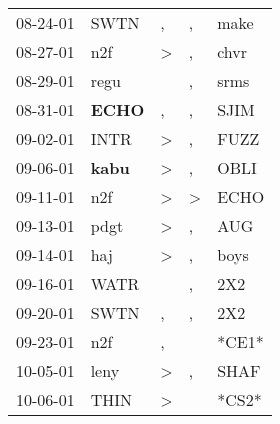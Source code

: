 \begin{supertabular}{p{0.07\textwidth}p{0.06\textwidth}p{0.02\textwidth}p{0.02\textwidth}p{0.06\textwidth}}
          08-24-01\textsuperscript{} &           SWTN\textsuperscript{} &                , &                , &           make\textsuperscript{} \\
          08-27-01\textsuperscript{} &            n2f\textsuperscript{} &     \textgreater &                , &           chvr\textsuperscript{} \\
          08-29-01\textsuperscript{} &           regu\textsuperscript{} &                  &                , &           srms\textsuperscript{} \\
          08-31-01\textsuperscript{} &  \textbf{ECHO\textsuperscript{}} &                , &                , &           SJIM\textsuperscript{} \\
          09-02-01\textsuperscript{} &           INTR\textsuperscript{} &     \textgreater &                , &           FUZZ\textsuperscript{} \\
          09-06-01\textsuperscript{} &  \textbf{kabu\textsuperscript{}} &     \textgreater &                , &           OBLI\textsuperscript{} \\
          09-11-01\textsuperscript{} &            n2f\textsuperscript{} &     \textgreater &     \textgreater &           ECHO\textsuperscript{} \\
          09-13-01\textsuperscript{} &           pdgt\textsuperscript{} &     \textgreater &                , &            AUG\textsuperscript{} \\
          09-14-01\textsuperscript{} &            haj\textsuperscript{} &     \textgreater &                , &           boys\textsuperscript{} \\
          09-16-01\textsuperscript{} &           WATR\textsuperscript{} &                  &                , &            2X2\textsuperscript{} \\
          09-20-01\textsuperscript{} &           SWTN\textsuperscript{} &                , &                , &            2X2\textsuperscript{} \\
          09-23-01\textsuperscript{} &            n2f\textsuperscript{} &                , &                  &                            *CE1* \\
          10-05-01\textsuperscript{} &           leny\textsuperscript{} &     \textgreater &                , &           SHAF\textsuperscript{} \\
          10-06-01\textsuperscript{} &           THIN\textsuperscript{} &     \textgreater &                  &                            *CS2* \\

\end{supertabular}
